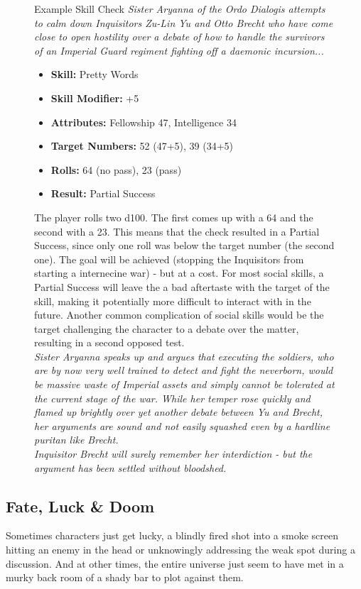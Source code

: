 \begin{figure}[ht]
	\begin{DndSidebar}{Example Skill Check}
	\textit{Sister Aryanna of the Ordo Dialogis attempts to calm down Inquisitors Zu-Lin Yu and Otto Brecht who have come close to open hostility over a debate of how to handle the survivors of an Imperial Guard regiment fighting off a daemonic incursion...}
	\begin{itemize}
		\item \textbf{Skill:} Pretty Words
		\item \textbf{Skill Modifier:} +5
		\item \textbf{Attributes:} Fellowship 47, Intelligence 34
		\item \textbf{Target Numbers:} 52 (47+5), 39 (34+5)
		\item \textbf{Rolls:} 64 (no pass), 23 (pass)
		\item \textbf{Result:} Partial Success
	\end{itemize}
	The player rolls two d100. The first comes up with a 64 and the second with a 23.
	This means that the check resulted in a Partial Success, since only one roll was below the target number (the second one).
	The goal will be achieved (stopping the Inquisitors from starting a internecine war) - but at a cost. For most social skills, a Partial Success will leave the a bad aftertaste with the target of the skill, making it potentially more difficult to interact with in the future. Another common complication of social skills would be the target challenging the character to a debate over the matter, resulting in a second opposed test. \\
	\textit{Sister Aryanna speaks up and argues that executing the soldiers, who are by now very well trained to detect and fight the neverborn, would be massive waste of Imperial assets and simply cannot be tolerated at the current stage of the war. While her temper rose quickly and flamed up brightly over yet another debate between Yu and Brecht, her arguments are sound and not easily squashed even by a hardline puritan like Brecht.\\
	Inquisitor Brecht will surely remember her interdiction - but the argument has been settled without bloodshed.}
	\end{DndSidebar}
\end{figure}

\subsection{Fate, Luck \& Doom}
Sometimes characters just get lucky, a blindly fired shot into a smoke screen hitting an enemy in the head or unknowingly addressing the weak spot during a discussion. And at other times, the entire universe just seem to have met in a murky back room of a shady bar to plot against them.

